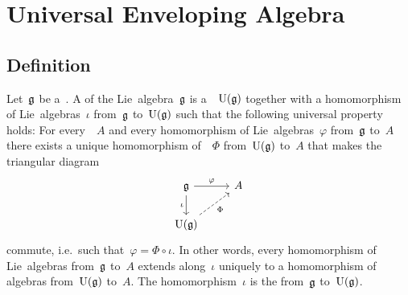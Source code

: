 \section{Universal Enveloping Algebra}





\subsection{Definition}


\begin{definition}
	Let~$\mathfrak{g}$ be a~\liealgebra{$\kf$}.
	A  of the Lie~algebra~$\mathfrak{g}$ is a~\algebra{$\kf$}~$\operatorname{U}(\mathfrak{g})$ together with a homomorphism of Lie~algebras~$\iota$ from~$\mathfrak{g}$ to~$\operatorname{U}(\mathfrak{g})$ such that the following universal property holds:
	For every~{\algebra{$\kf$}}~$A$ and every homomorphism of Lie~algebras~$\varphi$ from~$\mathfrak{g}$ to~$A$ there exists a unique homomorphism of~\algebras{$\kf$}~$\Phi$  from~$\operatorname{U}(\mathfrak{g})$ to~$A$ that makes the triangular diagram
	\[
		\begin{tikzcd}
			\glie
			\arrow{r}[above]{\varphi}
			\arrow{d}[left]{\iota}
			&
			A
			\\
			\Univ(\glie)
			\arrow[dashed]{ur}[below right]{\Phi}
			&
			{}
		\end{tikzcd}
	\]
	commute, i.e.\ such that~$\varphi = \Phi \circ \iota$.
	In other words, every homomorphism of Lie~algebras from~$\mathfrak{g}$ to~$A$ extends along~$\iota$ uniquely to a homomorphism of algebras from~$\operatorname{U}(\mathfrak{g})$ to~$A$.
	The homomorphism~$\iota$ is the  from~$\mathfrak{g}$ to~$\operatorname{U}(\mathfrak{g})$.
\end{definition}


